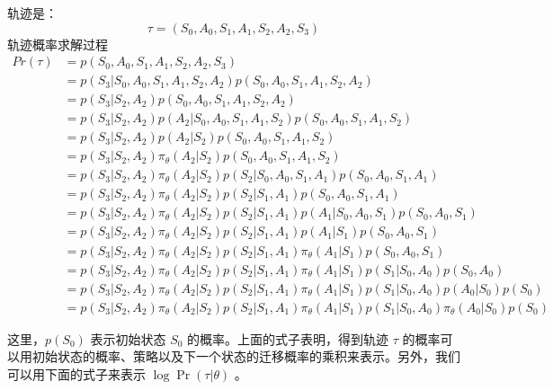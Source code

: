 \documentclass[lang=cn,newtx,10pt,scheme=chinese]{elegantbook}
\begin{document}
\begin{marker}
轨迹是：
\begin{equation*}
\tau=(S_{0},A_{0},S_{1},A_{1},S_{2},A_{2},S_{3})
\end{equation*}
轨迹概率求解过程
\begin{equation*}
\begin{aligned}
Pr(\tau) & = p(S_{0},A_{0},S_{1},A_{1},S_{2},A_{2},S_{3}) \\
& = p(S_{3}|S_{0},A_{0},S_{1},A_{1},S_{2},A_{2})p(S_{0},A_{0},S_{1},A_{1},S_{2},A_{2}) \\
& = p(S_{3}|S_{2},A_{2})p(S_{0},A_{0},S_{1},A_{1},S_{2},A_{2}) \\
& = p(S_{3}|S_{2},A_{2})p(A_{2}|S_{0},A_{0},S_{1},A_{1},S_{2})p(S_{0},A_{0},S_{1},A_{1},S_{2}) \\
& = p(S_{3}|S_{2},A_{2})p(A_{2}|S_{2})p(S_{0},A_{0},S_{1},A_{1},S_{2}) \\
& = p(S_{3}|S_{2},A_{2})\pi_{\theta}(A_{2}|S_{2})p(S_{0},A_{0},S_{1},A_{1},S_{2}) \\
& = p(S_{3}|S_{2},A_{2})\pi_{\theta}(A_{2}|S_{2})p(S_{2}|S_{0},A_{0},S_{1},A_{1})p(S_{0},A_{0},S_{1},A_{1}) \\
& = p(S_{3}|S_{2},A_{2})\pi_{\theta}(A_{2}|S_{2})p(S_{2}|S_{1},A_{1})p(S_{0},A_{0},S_{1},A_{1}) \\
& = p(S_{3}|S_{2},A_{2})\pi_{\theta}(A_{2}|S_{2})p(S_{2}|S_{1},A_{1})p(A_{1}|S_{0},A_{0},S_{1})p(S_{0},A_{0},S_{1}) \\
& = p(S_{3}|S_{2},A_{2})\pi_{\theta}(A_{2}|S_{2})p(S_{2}|S_{1},A_{1})p(A_{1}|S_{1})p(S_{0},A_{0},S_{1}) \\
& = p(S_{3}|S_{2},A_{2})\pi_{\theta}(A_{2}|S_{2})p(S_{2}|S_{1},A_{1})\pi_{\theta}(A_{1}|S_{1})p(S_{0},A_{0},S_{1}) \\
& = p(S_{3}|S_{2},A_{2})\pi_{\theta}(A_{2}|S_{2})p(S_{2}|S_{1},A_{1})\pi_{\theta}(A_{1}|S_{1})p(S_{1}|S_{0},A_{0})p(S_{0},A_{0}) \\
& = p(S_{3}|S_{2},A_{2})\pi_{\theta}(A_{2}|S_{2})p(S_{2}|S_{1},A_{1})\pi_{\theta}(A_{1}|S_{1})p(S_{1}|S_{0},A_{0})p(A_{0}|S_{0})p(S_{0}) \\
& = p(S_{3}|S_{2},A_{2})\pi_{\theta}(A_{2}|S_{2})p(S_{2}|S_{1},A_{1})\pi_{\theta}(A_{1}|S_{1})p(S_{1}|S_{0},A_{0})\pi_\theta(A_{0}|S_{0})p(S_{0})
\end{aligned}
\end{equation*}
\end{marker}

这里，$p(S_0)$ 表示初始状态 $S_0$ 的概率。上面的式子表明，得到轨迹 $\tau$ 的概率可以用初始状态的概率、策略以及下一个状态的迁移概率的乘积来表示。另外，我们可以用下面的式子来表示 $\log\Pr(\tau|\theta)$ 。
\end{document}

